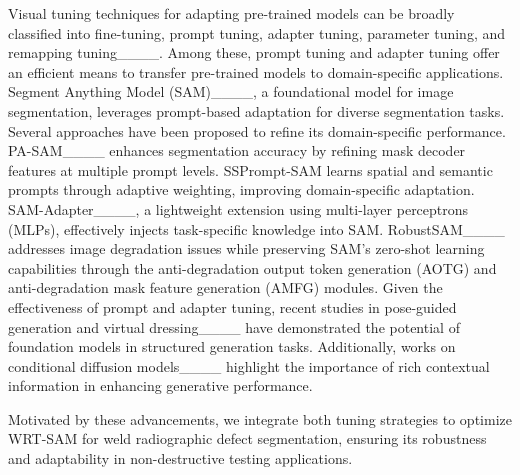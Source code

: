 Visual tuning techniques for adapting pre-trained models can be broadly classified into fine-tuning, prompt tuning, adapter tuning, parameter tuning, and remapping tuning____. Among these, prompt tuning and adapter tuning offer an efficient means to transfer pre-trained models to domain-specific applications. 
Segment Anything Model (SAM)____, a foundational model for image segmentation, leverages prompt-based adaptation for diverse segmentation tasks. Several approaches have been proposed to refine its domain-specific performance. PA-SAM____ enhances segmentation accuracy by refining mask decoder features at multiple prompt levels. SSPrompt-SAM learns spatial and semantic prompts through adaptive weighting, improving domain-specific adaptation. SAM-Adapter____, a lightweight extension using multi-layer perceptrons (MLPs), effectively injects task-specific knowledge into SAM. RobustSAM____ addresses image degradation issues while preserving SAM’s zero-shot learning capabilities through the anti-degradation output token generation (AOTG) and anti-degradation mask feature generation (AMFG) modules.
Given the effectiveness of prompt and adapter tuning, recent studies in pose-guided generation and virtual dressing____ have demonstrated the potential of foundation models in structured generation tasks. Additionally, works on conditional diffusion models____ highlight the importance of rich contextual information in enhancing generative performance. 

Motivated by these advancements, we integrate both tuning strategies to optimize WRT-SAM for weld radiographic defect segmentation, ensuring its robustness and adaptability in non-destructive testing applications.


